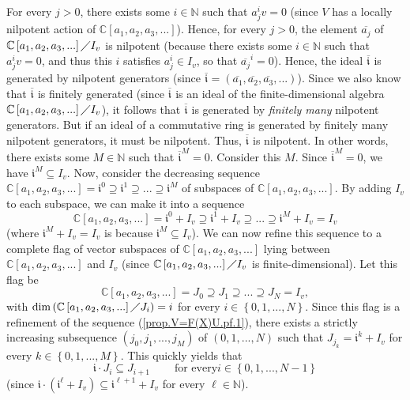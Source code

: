 \documentclass
[numbers=enddot,12pt,final,onecolumn,german,notitlepage]{scrartcl}%
\theoremstyle{definition}
\begin{document}
For every $j>0$, there exists some $i\in\mathbb{N}$ such that $a_{j}^{i}v=0$
(since $V$ has a locally nilpotent action of $\mathbb{C}\left[  a_{1}%
,a_{2},a_{3},...\right]  $). Hence, for every $j>0$, the element
$\overline{a_{j}}$ of $\mathbb{C}\left[  a_{1},a_{2},a_{3},...\right]  \diagup
I_{v}$ is nilpotent (because there exists some $i\in\mathbb{N}$ such that
$a_{j}^{i}v=0$, and thus this $i$ satisfies $a_{j}^{i}\in I_{v}$, so that
$\overline{a_{j}}^{i}=0$). Hence, the ideal $\overline{\mathfrak{i}}$ is
generated by nilpotent generators (since $\overline{\mathfrak{i}}=\left(
\overline{a_{1}},\overline{a_{2}},\overline{a_{3}},...\right)  $). Since we
also know that $\overline{\mathfrak{i}}$ is finitely generated (since
$\overline{\mathfrak{i}}$ is an ideal of the finite-dimensional algebra
$\mathbb{C}\left[  a_{1},a_{2},a_{3},...\right]  \diagup I_{v}$), it follows
that $\overline{\mathfrak{i}}$ is generated by \textit{finitely many}
nilpotent generators. But if an ideal of a commutative ring is generated by
finitely many nilpotent generators, it must be nilpotent. Thus, $\overline
{\mathfrak{i}}$ is nilpotent. In other words, there exists some $M\in
\mathbb{N}$ such that $\overline{\mathfrak{i}}^{M}=0$. Consider this $M$.
Since $\overline{\mathfrak{i}}^{M}=0$, we have $\mathfrak{i}^{M}\subseteq
I_{v}$. Now, consider the decreasing sequence $\mathbb{C}\left[  a_{1}%
,a_{2},a_{3},...\right]  =\mathfrak{i}^{0}\supseteq\mathfrak{i}^{1}%
\supseteq...\supseteq\mathfrak{i}^{M}$ of subspaces of $\mathbb{C}\left[
a_{1},a_{2},a_{3},...\right]  $. By adding $I_{v}$ to each subspace, we can
make it into a sequence
\begin{equation}
\mathbb{C}\left[  a_{1},a_{2},a_{3},...\right]  =\mathfrak{i}^{0}%
+I_{v}\supseteq\mathfrak{i}^{1}+I_{v}\supseteq...\supseteq\mathfrak{i}%
^{M}+I_{v}=I_{v} \label{prop.V=F(X)U.pf.1}%
\end{equation}
(where $\mathfrak{i}^{M}+I_{v}=I_{v}$ is because $\mathfrak{i}^{M}\subseteq
I_{v}$). We can now refine this sequence to a complete flag of vector
subspaces of $\mathbb{C}\left[  a_{1},a_{2},a_{3},...\right]  $ lying between
$\mathbb{C}\left[  a_{1},a_{2},a_{3},...\right]  $ and $I_{v}$ (since
$\mathbb{C}\left[  a_{1},a_{2},a_{3},...\right]  \diagup I_{v}$ is
finite-dimensional). Let this flag be%
\[
\mathbb{C}\left[  a_{1},a_{2},a_{3},...\right]  =J_{0}\supseteq J_{1}%
\supseteq...\supseteq J_{N}=I_{v},
\]
with $\dim\left(  \mathbb{C}\left[  a_{1},a_{2},a_{3},...\right]  \diagup
J_{i}\right)  =i$ for every $i\in\left\{  0,1,...,N\right\}  $. Since this
flag is a refinement of the sequence (\ref{prop.V=F(X)U.pf.1}), there exists a
strictly increasing subsequence $\left(  j_{0},j_{1},...,j_{M}\right)  $ of
$\left(  0,1,...,N\right)  $ such that $J_{j_{k}}=\mathfrak{i}^{k}+I_{v}$ for
every $k\in\left\{  0,1,...,M\right\}  $. This quickly yields that%
\begin{equation}
\mathfrak{i}\cdot J_{i}\subseteq J_{i+1}\ \ \ \ \ \ \ \ \ \ \text{for every
}i\in\left\{  0,1,...,N-1\right\}  \label{prop.V=F(X)U.pf.2}%
\end{equation}
(since $\mathfrak{i}\cdot\left(  \mathfrak{i}^{\ell}+I_{v}\right)
\subseteq\mathfrak{i}^{\ell+1}+I_{v}$ for every $\ell\in\mathbb{N}$).
\end{document}
